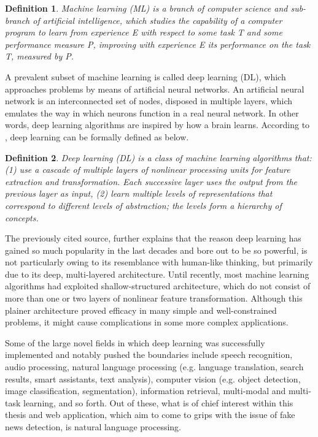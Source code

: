 \documentclass[12pt, a4paper]{article}
\newtheorem{definition}{Definition}
\begin{document}
  \begin{definition}
    Machine learning (ML) is a branch of computer science and sub-branch of artificial intelligence, which studies the capability of a computer program to learn from experience E with respect to some task T and some performance measure P, improving with experience E its performance on the task T, measured by P.
  \end{definition}
  
  A prevalent subset of machine learning is called deep learning (DL), which approaches problems by means of artificial neural networks. An artificial neural network is an interconnected set of nodes, disposed in multiple layers, which emulates the way in which neurons function in a real neural network. In other words, deep learning algorithms are inspired by how a brain learns. According to \cite{a7}, deep learning can be formally defined as below.

  \begin{definition}
    Deep learning (DL) is a class of machine learning algorithms that: (1) use a cascade of multiple layers of nonlinear processing units for feature extraction and transformation. Each successive layer uses the output from the previous layer as input, (2) learn multiple levels of representations that correspond to different levels of abstraction; the levels form a hierarchy of concepts.
  \end{definition}

  The previously cited source, further explains that the reason deep learning has gained so much popularity in the last decades and bore out to be so powerful, is not particularly owing to its resemblance with human-like thinking, but primarily due to its deep, multi-layered architecture. Until recently, most machine learning algorithms had exploited shallow-structured architecture, which do not consist of more than one or two layers of nonlinear feature transformation. Although this plainer architecture proved efficacy in many simple and well-constrained problems, it might cause complications in some more complex applications.

  Some of the large novel fields in which deep learning was successfully implemented and notably pushed the boundaries include speech recognition, audio processing, natural language processing (e.g. language translation, search results, smart assistants, text analysis), computer vision (e.g. object detection, image classification, segmentation), information retrieval, multi-modal and multi-task learning, and so forth. Out of these, what is of chief interest within this thesis and web application, which aim to come to grips with the issue of fake news detection, is natural language processing.
\end{document}
